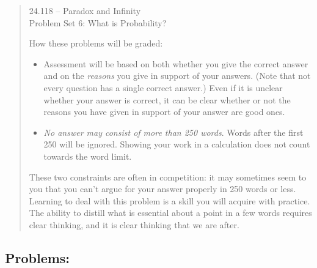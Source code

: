 \documentclass[12pt,a4paper]{article}
\begin{document}
\begin{quote}

\begin{center} {\large 24.118 -- Paradox and Infinity \\ \vspace{1mm}}
 {\large Problem Set 6: What is Probability? \\ \vspace{1mm}}
 
\end{center}
\vspace{3mm}

\noindent How these problems will be graded:

\begin{itemize} 

\item Assessment will be based on both whether you give the correct answer and on the \emph{reasons} you give in support of your answers. (Note that not every question has a single correct answer.) Even if it is unclear whether your answer is correct, it can be clear whether or not the reasons you have given in support of your answer are good ones. 

\item  \emph{No answer may consist of more than 250 words}. Words after the first 250 will be ignored. Showing your work in a calculation does not count towards the word limit.


\end{itemize} 

These two constraints are often in competition: it may sometimes seem to you that you can't argue for your answer properly in 250 words or less. Learning to deal with this problem is a skill you will acquire with practice. The ability to distill what is essential about a point in a few words requires clear thinking, and it is clear thinking that we are after.


\end{quote} 


\subsection*{Problems:}
\end{document}
